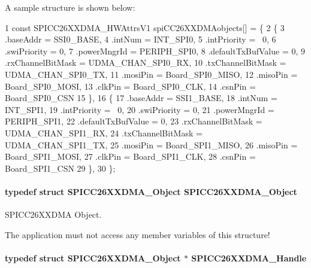 A sample structure is shown below\+: 
\begin{DoxyCode}
1 const SPICC26XXDMA\_HWAttrsV1 spiCC26XXDMAobjects[] = \{
2     \{
3         .baseAddr = SSI0\_BASE,
4         .intNum = INT\_SPI0,
5         .intPriority = ~0,
6         .swiPriority = 0,
7         .powerMngrId = PERIPH\_SPI0,
8         .defaultTxBufValue = 0,
9         .rxChannelBitMask = UDMA\_CHAN\_SPI0\_RX,
10         .txChannelBitMask = UDMA\_CHAN\_SPI0\_TX,
11         .mosiPin = Board\_SPI0\_MISO,
12         .misoPin = Board\_SPI0\_MOSI,
13         .clkPin = Board\_SPI0\_CLK,
14         .csnPin = Board\_SPI0\_CSN
15     \},
16     \{
17         .baseAddr = SSI1\_BASE,
18         .intNum = INT\_SPI1,
19         .intPriority = ~0,
20         .swiPriority = 0,
21         .powerMngrId = PERIPH\_SPI1,
22         .defaultTxBufValue = 0,
23         .rxChannelBitMask = UDMA\_CHAN\_SPI1\_RX,
24         .txChannelBitMask = UDMA\_CHAN\_SPI1\_TX,
25         .mosiPin = Board\_SPI1\_MISO,
26         .misoPin = Board\_SPI1\_MOSI,
27         .clkPin = Board\_SPI1\_CLK,
28         .csnPin = Board\_SPI1\_CSN
29     \},
30 \};
\end{DoxyCode}
\paragraph[{S\+P\+I\+C\+C26\+X\+X\+D\+M\+A\+\_\+\+Object}]{\setlength{\rightskip}{0pt plus 5cm}typedef struct {\bf S\+P\+I\+C\+C26\+X\+X\+D\+M\+A\+\_\+\+Object}  {\bf S\+P\+I\+C\+C26\+X\+X\+D\+M\+A\+\_\+\+Object}}\label{_s_p_i_c_c26_x_x_d_m_a_8h_a17ff5bb4e58bb3bf27c26a711489f5e6}


S\+P\+I\+C\+C26\+X\+X\+D\+M\+A Object. 

The application must not access any member variables of this structure! 
\paragraph[{S\+P\+I\+C\+C26\+X\+X\+D\+M\+A\+\_\+\+Handle}]{\setlength{\rightskip}{0pt plus 5cm}typedef struct {\bf S\+P\+I\+C\+C26\+X\+X\+D\+M\+A\+\_\+\+Object} $\ast$ {\bf S\+P\+I\+C\+C26\+X\+X\+D\+M\+A\+\_\+\+Handle}}\label{_s_p_i_c_c26_x_x_d_m_a_8h_a23f13f9c52a6ced04e082c64bebf128f}


